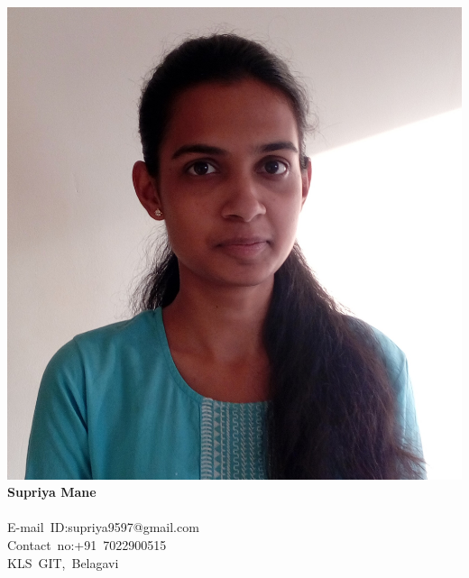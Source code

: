 \documentclass[12pt,a4paper]{article}
\begin{document}
\paragraph{}
\includegraphics[scale=0.05]{profile}
\textbf{\LARGE Supriya Mane\\}\hfill
\\
\mbox{E-mail ID:\large supriya9597@gmail.com}\\
\mbox{Contact no:\large +91 7022900515}\\
\mbox{\large KLS GIT, Belagavi}\\
\end{document}
